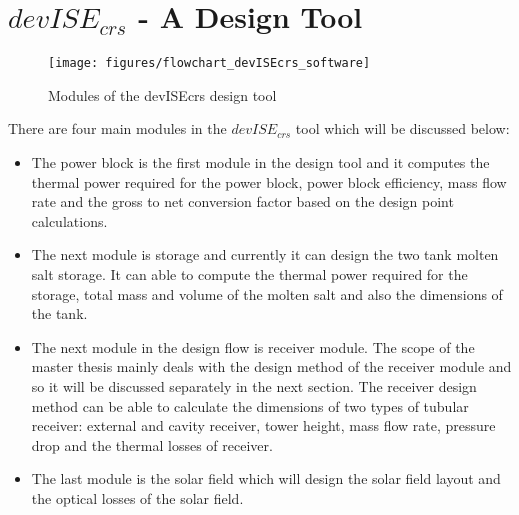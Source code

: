 \section{$devISE_{crs}$ - A Design Tool}
\begin{figure}[h!]
	\texttt{[image: figures/flowchart\_devISEcrs\_software]}
	\centering
	\caption{Modules of the devISEcrs design tool}	
\end{figure}
There are four main modules in the $devISE_{crs}$ tool which will be discussed below:
\begin{itemize}
	\item The power block is the first module in the design tool and it computes the thermal power required for the power block, power block efficiency, mass flow rate and the gross to net conversion factor based on the design point calculations.
	\item The next module is storage and currently it can design the two tank molten salt storage. It can able to compute the thermal power required for the storage, total mass and volume of the molten salt and also the dimensions of the tank.
	\item The next module in the design flow is receiver module. The scope of the master thesis mainly deals with the design method of the receiver module and so it will be discussed separately in the next section. The receiver design method can be able to calculate the dimensions of two types of tubular receiver: external and cavity receiver, tower height, mass flow rate, pressure drop and the thermal losses of receiver.
	\item  The last module is the solar field which will design the solar field layout and the optical losses of the solar field. 
\end{itemize}  
